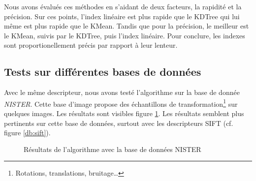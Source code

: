 \documentclass{article}
\begin{document}
Nous avons évalués ces méthodes en s'aidant de deux facteurs, la rapidité et la précision.
Sur ces points, l'index linéaire est plus rapide que le KDTree qui lui même est plus rapide que le KMean.
Tandis que pour la précision, le meilleur est le KMean, suivis par le KDTree, puis l'index linéaire.
Pour conclure, les indexes sont proportionellement précis par rapport à leur lenteur.



\subsection{Tests sur différentes bases de données}

Avec le même descripteur, nous avons testé l'algorithme sur la base de donnée {\em NISTER}. Cette base
d'image propose des échantillons de transformation\footnote{Rotations, translations, bruitage\ldots} sur quelques images.
Les résultats sont visibles figure \ref{db}. Les résultats semblent plus pertinents sur cette base de données,
surtout avec les descripteurs SIFT (cf. figure \ref{db:sift}).

\begin{figure}[!ht]%
  \centering
  \hspace{0.01\textwidth}
  \caption{Résultats de l'algorithme avec la base de données NISTER}
  \label{db}
\end{figure}
\end{document}
